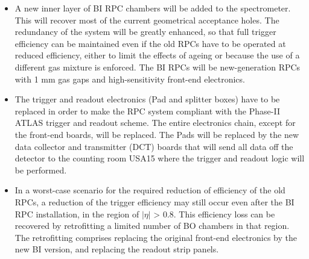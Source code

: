 \begin{itemize}
	\item A new inner layer of BI RPC chambers will be added to the spectrometer. This will
recover most of the current geometrical acceptance holes. The redundancy of the
system will be greatly enhanced, so that full trigger efficiency can be maintained even
if the old RPCs have to be operated at reduced efficiency, either to limit the effects of
ageing or because the use of a different gas mixture is enforced. The BI RPCs will be
new-generation RPCs with 1 mm gas gaps and high-sensitivity front-end electronics.
	\item The trigger and readout electronics (Pad and splitter boxes) have to be replaced in order
to make the RPC system compliant with the Phase-II ATLAS trigger and readout
scheme. The entire electronics chain, except for the front-end boards, will be replaced.
The Pads will be replaced by the new data collector and transmitter (DCT) boards that
will send all data off the detector to the counting room USA15 where the trigger and
readout logic will be performed.
	\item In a worst-case scenario for the required reduction of efficiency of the old RPCs, a
reduction of the trigger efficiency may still occur even after the BI RPC installation,
in the region of $|\eta|$ > 0.8. This efficiency loss can be recovered by retrofitting a limited
number of BO chambers in that region. The retrofitting comprises replacing the
original front-end electronics by the new BI version, and replacing the readout strip
panels.
\end{itemize}
\newpage
